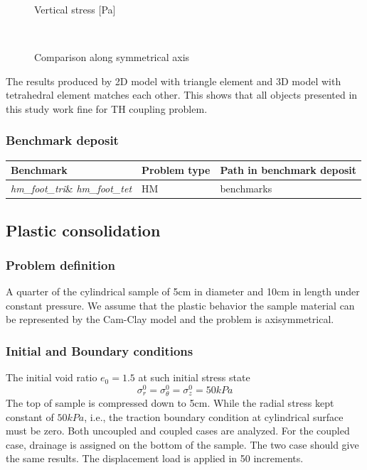 \begin{figure}[H]
\begin{center}
\begin{minipage}[t]{0.4\textwidth}
\begin{center}
    \centerline{Vertical stress [Pa]}
    \end{center}
   \end{minipage}\\
  \end{center}
  \caption{Comparison along symmetrical axis}
  \label{fig:e11}
\end{figure}

The results produced by 2D model with triangle element and 3D model
with tetrahedral element matches each other. This shows that all
objects presented in this study work fine for TH coupling problem.
\subsubsection*{Benchmark deposit}
\begin{tabular}{|l|l|l|}
  \hline
  Benchmark & Problem type & Path in benchmark deposit \\
  \hline
 \emph{hm\_foot\_tri}\&  \emph{hm\_foot\_tet}& HM & benchmarks\verb \HM\ \\
  \hline
\end{tabular}

\subsection{Plastic consolidation}
\subsubsection*{Problem definition}
 A quarter of the cylindrical
sample of 5cm in diameter and 10cm in length under constant pressure. We assume that the plastic behavior the sample material
can be represented by the Cam-Clay model and the problem is axisymmetrical.
\subsubsection*{Initial and Boundary conditions}
The initial void ratio $e_0=1.5$ at such initial stress state
\[
\sigma_{r}^0=\sigma_{\theta}^0=\sigma_{z}^0=50kPa
\]
The top of sample is compressed down to 5cm.  While the radial
stress kept constant of $50kPa$, i.e., the traction boundary
condition at cylindrical surface must be zero. Both uncoupled and
coupled cases are analyzed. For the coupled case, drainage is
assigned on the bottom of the sample. The two case should give the
same results. The displacement load is applied in 50 increments.

